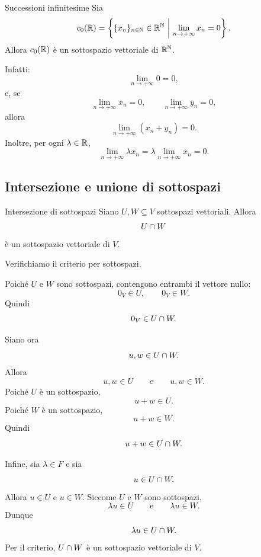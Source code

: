 \documentclass[a4paper]{article}
\begin{document}
\begin{snippetexample}{Successioni infinitesime}
    Sia
    \[
        c_0(\mathbb{R})
        =
        \left\{
            \{x_n\}_{n\in\mathbb{N}}\in\mathbb{R}^{\mathbb{N}}
            \ \middle|\
            \lim_{n\to+\infty}x_n=0
        \right\}.
    \]
    Allora \(c_0(\mathbb{R})\) è un sottospazio vettoriale di \(\mathbb{R}^{\mathbb{N}}\).

    Infatti:
    \[
        \lim_{n\to+\infty}0=0,
    \]
    e, se
    \[
        \lim_{n\to+\infty}x_n=0,
        \qquad
        \lim_{n\to+\infty}y_n=0,
    \]
    allora
    \[
        \lim_{n\to+\infty}(x_n+y_n)=0.
    \]
    Inoltre, per ogni \(\lambda\in\mathbb{R}\),
    \[
        \lim_{n\to+\infty}\lambda x_n
        =
        \lambda\lim_{n\to+\infty}x_n
        =
        0.
    \]
\end{snippetexample}

\subsection{Intersezione e unione di sottospazi}

\begin{snippetproposition}{Intersezione di sottospazi}
    Siano \(U,W\subseteq V\) sottospazi vettoriali. Allora
    \[
        U\cap W
    \]
    è un sottospazio vettoriale di \(V\).
\end{snippetproposition}

\begin{snippetproof}{}
    Verifichiamo il criterio per sottospazi.

    Poiché \(U\) e \(W\) sono sottospazi, contengono entrambi il vettore nullo:
    \[
        0_V\in U,
        \qquad
        0_V\in W.
    \]
    Quindi
    \[
        0_V\in U\cap W.
    \]

    Siano ora
    \[
        u,w\in U\cap W.
    \]
    Allora
    \[
        u,w\in U
        \qquad
        \text{e}
        \qquad
        u,w\in W.
    \]
    Poiché \(U\) è un sottospazio,
    \[
        u+w\in U.
    \]
    Poiché \(W\) è un sottospazio,
    \[
        u+w\in W.
    \]
    Quindi
    \[
        u+w\in U\cap W.
    \]

    Infine, sia \(\lambda\in F\) e sia
    \[
        u\in U\cap W.
    \]
    Allora \(u\in U\) e \(u\in W\). Siccome \(U\) e \(W\) sono sottospazi,
    \[
        \lambda u\in U
        \qquad
        \text{e}
        \qquad
        \lambda u\in W.
    \]
    Dunque
    \[
        \lambda u\in U\cap W.
    \]
    Per il criterio, \(U\cap W\) è un sottospazio vettoriale di \(V\).
\end{snippetproof}
\end{document}
